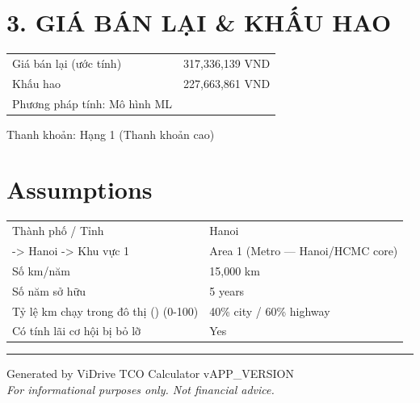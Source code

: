 \documentclass[11pt,a4paper]{article}
\begin{document}
\section*{3. GIÁ BÁN LẠI \& KHẤU HAO}
\begin{tabular}{l r}
\toprule
Giá bán lại (ước tính) & 317,336,139 VND \\
Khấu hao & 227,663,861 VND \\
Phương pháp tính: Mô hình ML &  \\
\bottomrule
\end{tabular}
\vspace{0.3cm}Thanh khoản: Hạng 1 (Thanh khoản cao)

\section*{Assumptions}
\begin{center}
\begin{tabular}{l l}
\toprule
Thành phố / Tỉnh & Hanoi \\
  -> Hanoi -> Khu vực 1 & Area 1 (Metro — Hanoi/HCMC core) \\
Số km/năm & 15,000 km \\
Số năm sở hữu & 5 years \\
  Tỷ lệ km chạy trong đô thị () (0-100) & 40\% city / 60\% highway \\
  Có tính lãi cơ hội bị bỏ lỡ & Yes \\
\bottomrule
\end{tabular}
\end{center}
\vspace{0.5cm}
\vspace{1cm}
\hrule
\vspace{0.3cm}
\begin{center}
    {\small Generated by ViDrive TCO Calculator v{APP_VERSION}}\\
    {\small \textit{For informational purposes only. Not financial advice.}}
\end{center}
\end{document}
